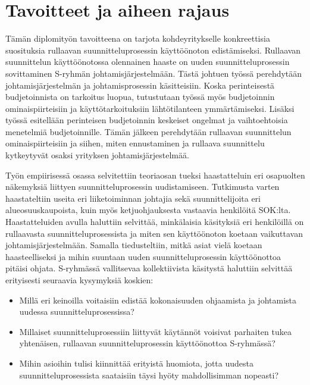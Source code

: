 \documentclass[12pt,a4paper,oneside,pdftex]{report}
\begin{document}
\section{Tavoitteet ja aiheen rajaus}
\label{section:tavoitteet}

Tämän diplomityön tavoitteena on tarjota kohdeyritykselle konkreettisia suosituksia rullaavan suunnitteluprosessin käyttöönoton edistämiseksi. Rullaavan suunnittelun käyttöönotossa olennainen haaste on uuden suunnitteluprosessin sovittaminen S-ryhmän johtamisjärjestelmään. Tästä johtuen työssä perehdytään johtamisjärjestelmän ja johtamisprosessin käsitteisiin. Koska perinteisestä budjetoinnista on tarkoitus luopua, tutustutaan työssä myös budjetoinnin ominaispiirteisiin ja käyttötarkoituksiin lähtötilanteen ymmärtämiseksi. Lisäksi työssä esitellään perinteisen budjetoinnin keskeiset ongelmat ja vaihtoehtoisia menetelmiä budjetoinnille. Tämän jälkeen perehdytään rullaavan suunnittelun ominaispiirteisiin ja siihen, miten ennustaminen ja rullaava suunnittelu kytkeytyvät osaksi yrityksen johtamisjärjestelmää.

Työn empiirisessä osassa selvitettiin teoriaosan tueksi haastatteluin eri osapuolten näkemyksiä liittyen suunnitteluprosessin uudistamiseen. Tutkimusta varten haastateltiin useita eri liiketoiminnan johtajia sekä suunnittelijoita eri alueosuuskaupoista, kuin myös ketjuohjauksesta vastaavia henkilöitä SOK:lta. Haastatteluiden avulla haluttiin selvittää, minkälaisia käsityksiä eri henkilöillä on rullaavasta suunnitteluprosessista ja miten sen käyttöönoton koetaan vaikuttavan johtamisjärjestelmään. Samalla tiedusteltiin, mitkä asiat vielä koetaan haasteelliseksi ja mihin suuntaan uuden suunnitteluprosessin käyttöönottoa pitäisi ohjata. S-ryhmässä vallitsevaa kollektiivista käsitystä haluttiin selvittää erityisesti seuraavia kysymyksiä koskien:


\begin{itemize}
\setlength{\itemsep}{0pt}
\item Millä eri keinoilla voitaisiin edistää kokonaisuuden ohjaamista ja johtamista uudessa suunnitteluprosessissa?
\item Millaiset suunnitteluprosessiin liittyvät käytännöt voisivat parhaiten tukea yhtenäisen, rullaavan suunnitteluprosessin käyttöönottoa S-ryhmässä?
\item Mihin asioihin tulisi kiinnittää erityistä huomiota, jotta uudesta suunnitteluprosessista saataisiin täysi hyöty mahdollisimman nopeasti?
\end{itemize}
\end{document}
